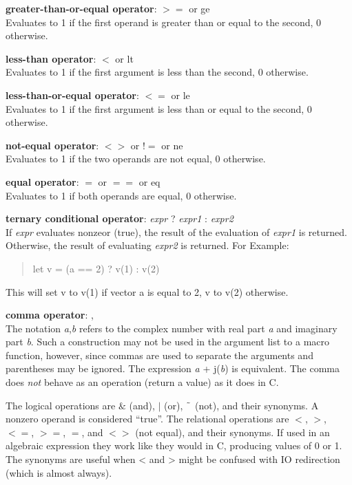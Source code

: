 \begin{description}
\item{{\bf greater-than-or-equal operator}: {\vt $>=$} or {\vt ge}}\\
Evaluates to 1 if the first operand is greater than or equal to
the second, 0 otherwise.

\item{{\bf less-than operator}: {\vt $<$} or {\vt lt}}\\
Evaluates to 1 if the first argument is less than the second, 0
otherwise.

\item{{\bf less-than-or-equal operator}: {\vt $<=$} or {\vt le}}\\
Evaluates to 1 if the first argument is less than or equal to the
second, 0 otherwise.

\item{{\bf not-equal operator}: {\vt $<>$} or {\vt $!=$} or {\vt ne}}\\
Evaluates to 1 if the two operands are not equal, 0 otherwise.

\item{{\bf equal operator}: {\vt $=$} or {\vt $==$} or {\vt eq}}\\
Evaluates to 1 if both operands are equal, 0 otherwise.

\item{{\bf ternary conditional operator}:
      {\it expr} {\vt ?} {\it expr1} {\vt :} {\it expr2}}\\
If {\it expr} evaluates nonzeor (true), the result of the evaluation
of {\it expr1} is returned.  Otherwise, the result of evaluating
{\it expr2} is returned.  For Example:
\begin{quote}
\vt let v = (a == 2) ? v(1) : v(2)
\end{quote}
This will set {\vt v} to {\vt v(1)} if vector {\vt a} is equal to 2,
{\vt v} to {\vt v(2)} otherwise.

\item{{\bf comma operator}: {\vt ,}}\\
The notation {\it a\/},{\it b} refers to the complex number with real
part {\it a} and imaginary part {\it b}.  Such a construction may not
be used in the argument list to a macro function, however, since
commas are used to separate the arguments and parentheses may be
ignored.  The expression {\it a} + {\vt j}({\it b\/}) is equivalent. 
The comma does {\it not} behave as an operation (return a value) as it
does in C.
\end{description}

The logical operations are {\vt $\&$} (and), {\vt $|$} (or), {\vt
$\symbol{126}$} (not), and their synonyms.  A nonzero operand is
considered ``true''.  The relational operations are {\vt $<$}, {\vt
$>$}, {\vt $<=$}, {\vt $>=$}, {\vt $=$}, and {\vt $<>$} (not equal),
and their synonyms.  If used in an algebraic expression they work like
they would in C, producing values of 0 or 1.  The synonyms are useful
when {\vt <} and {\vt >} might be confused with IO redirection (which
is almost always).

